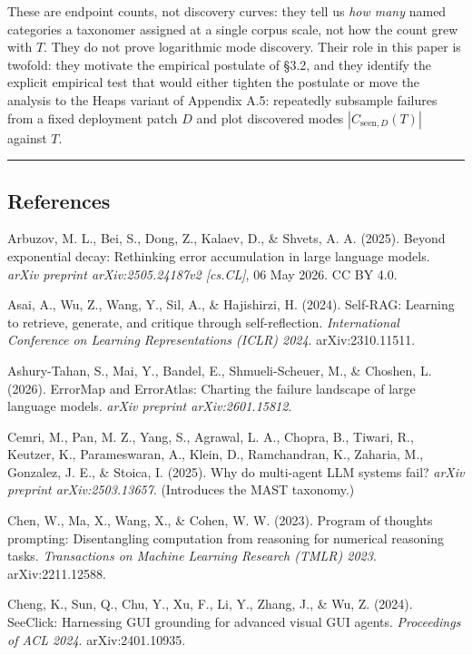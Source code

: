 \documentclass[
]{article}
\begin{document}
These are endpoint counts, not discovery curves: they tell us \emph{how
many} named categories a taxonomer assigned at a single corpus scale,
not how the count grew with \(T\). They do not prove logarithmic mode
discovery. Their role in this paper is twofold: they motivate the
empirical postulate of §3.2, and they identify the explicit empirical
test that would either tighten the postulate or move the analysis to the
Heaps variant of Appendix A.5: repeatedly subsample failures from a
fixed deployment patch \(D\) and plot discovered modes
\(|C_{\text{seen},D}(T)|\) against \(T\).

\begin{center}\rule{0.5\linewidth}{0.5pt}\end{center}

\subsection{References}\label{references}

Arbuzov, M. L., Bei, S., Dong, Z., Kalaev, D., \& Shvets, A. A. (2025).
Beyond exponential decay: Rethinking error accumulation in large
language models. \emph{arXiv preprint arXiv:2505.24187v2 {[}cs.CL{]}},
06 May 2026. CC BY 4.0.

Asai, A., Wu, Z., Wang, Y., Sil, A., \& Hajishirzi, H. (2024). Self-RAG:
Learning to retrieve, generate, and critique through self-reflection.
\emph{International Conference on Learning Representations (ICLR) 2024}.
arXiv:2310.11511.

Ashury-Tahan, S., Mai, Y., Bandel, E., Shmueli-Scheuer, M., \& Choshen,
L. (2026). ErrorMap and ErrorAtlas: Charting the failure landscape of
large language models. \emph{arXiv preprint arXiv:2601.15812}.

Cemri, M., Pan, M. Z., Yang, S., Agrawal, L. A., Chopra, B., Tiwari, R.,
Keutzer, K., Parameswaran, A., Klein, D., Ramchandran, K., Zaharia, M.,
Gonzalez, J. E., \& Stoica, I. (2025). Why do multi-agent LLM systems
fail? \emph{arXiv preprint arXiv:2503.13657}. (Introduces the MAST
taxonomy.)

Chen, W., Ma, X., Wang, X., \& Cohen, W. W. (2023). Program of thoughts
prompting: Disentangling computation from reasoning for numerical
reasoning tasks. \emph{Transactions on Machine Learning Research (TMLR)
2023}. arXiv:2211.12588.

Cheng, K., Sun, Q., Chu, Y., Xu, F., Li, Y., Zhang, J., \& Wu, Z.
(2024). SeeClick: Harnessing GUI grounding for advanced visual GUI
agents. \emph{Proceedings of ACL 2024}. arXiv:2401.10935.
\end{document}
